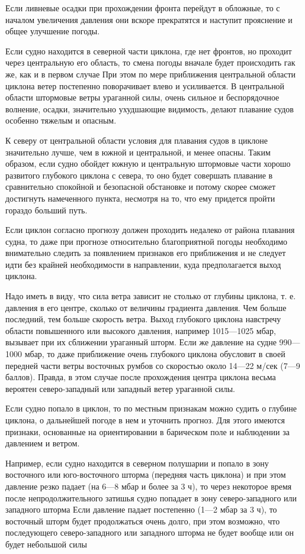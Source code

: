 Если ливневые осадки при прохождении фронта перейдут в обложные, то с началом увеличения давления они вскоре прекратятся и наступит прояснение и общее улучшение погоды.

Если судно находится в северной части циклона, где нет фронтов, но проходит через центральную его область, то смена погоды вначале будет происходить гак же, как и в первом случае При этом по мере приближения центральной области циклона ветер постепенно поворачивает влево и усиливается. В центральной области штормовые ветры ураганной силы, очень сильное и беспорядочное волнение, осадки, значительно ухудшающие видимость, делают плавание судов особенно тяжелым и опасным.

К северу от центральной области условия для плавания судов в циклоне значительно лучше, чем в южной и центральной, и менее опасны. Таким образом, если судно обойдет южную и центральную штормовые части хорошо развитого глубокого циклона с севера, то оно будет совершать плавание в сравнительно спокойной и безопасной обстановке и потому скорее сможет достигнуть намеченного пункта, несмотря на то, что ему придется пройти гораздо больший путь.

Если циклон согласно прогнозу должен проходить недалеко от района плавания судна, то даже при прогнозе относительно благоприятной погоды необходимо внимательно следить за появлением признаков его приближения и не следует идти без крайней необходимости в направлении, куда предполагается выход циклона.

Надо иметь в виду, что сила ветра зависит не столько от глубины циклона, т. е. давления в его центре, сколько от величины градиента давления. Чем больше последний, тем больше скорость ветра. Выход глубокого циклона навстречу области повышенного или высокого давления, например 1015—1025 мбар, вызывает при их сближении ураганный шторм. Если же давление на судне 990—1000 мбар, то даже приближение очень глубокого циклона обусловит в своей передней части ветры восточных румбов со скоростью около 14—22 м/сек (7—9 баллов). Правда, в этом случае после прохождения центра циклона весьма вероятен северо-западный или западный ветер ураганной силы.

Если судно попало в циклон, то по местным признакам можно судить о глубине циклона, о дальнейшей погоде в нем и уточнить прогноз. Для этого имеются признаки, основанные на ориентировании в барическом поле и наблюдении за давлением и ветром.

Например, если судно находится в северном полушарии и попало в зону восточного или юго-восточного шторма (передняя часть циклона) и при этом давление резко падает (на 6—8 мбар и более за 3 ч), то через некоторое время после непродолжительного затишья судно попадает в зону северо-западного или западного шторма Если давление падает постепенно (1—2 мбар за 3 ч), то восточный шторм будет продолжаться очень долго, при этом возможно, что последующего северо-западного или западного шторма не будет вообще или он будет небольшой силы

